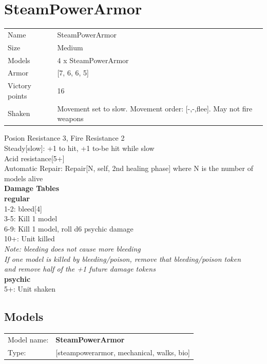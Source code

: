\clearpage

\section{ SteamPowerArmor }

\begin{tabular}{ll}
  Name & SteamPowerArmor \\
  Size & Medium\\
  Models & 4 x SteamPowerArmor\\
  Armor & [7, 6, 6, 5]\\
  Victory points & 16\\
  Shaken & Movement set to slow. Movement order: [-,-,flee]. May not fire weapons\\
\end{tabular}

Posion Resistance 3, Fire Resistance 2\\ 
Steady[slow]: +1 to hit, +1 to-be hit while slow\\ 
Acid resistance[5+]\\ 
Automatic Repair: Repair[N, self, 2nd healing phase] where N is the number of models alive\\ 



{\bf Damage Tables} \\
 {\bf regular } \\
1-2: bleed[4] \\
3-5: Kill 1 model \\
6-9: Kill 1 model, roll d6 psychic damage \\
10+: Unit killed \\
{{\it Note: bleeding does not cause more bleeding}} \\
{{\it If one model is killed by bleeding/poison, remove that bleeding/poison token}} \\
{{\it and remove half of the +1 future damage tokens}} \\
 {\bf psychic } \\
5+: Unit shaken \\


\clearpage

\subsection{ Models }

\begin{tabular}{ll}
Model name: & {\bf SteamPowerArmor } \\
Type: & [steampowerarmor, mechanical, walks, bio] \\
\end{tabular}

